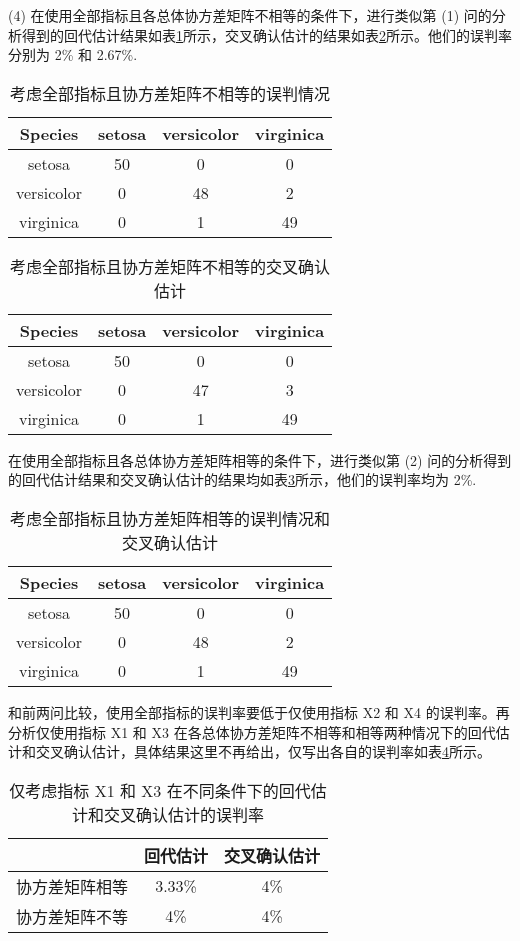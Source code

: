 \documentclass{ctexrep}
\begin{document}
(4) 在使用全部指标且各总体协方差矩阵不相等的条件下，进行类似第 (1) 问的分析得到的回代估计结果如表\ref{tab:ex555}所示，交叉确认估计的结果如表\ref{tab:ex556}所示。他们的误判率分别为 2\% 和 2.67\%.
\begin{table}[ht!]
\begin{center}
\begin{tabular}{c|ccc}
Species & setosa & versicolor & virginica \\
\hline
setosa & 50 & 0 & 0 \\
versicolor & 0 & 48 & 2 \\
virginica & 0 & 1 & 49
\end{tabular}
\end{center}
\caption{考虑全部指标且协方差矩阵不相等的误判情况}
\label{tab:ex555}
\end{table}
\begin{table}[h!]
\begin{center}
\begin{tabular}{c|ccc}
Species & setosa & versicolor & virginica \\
\hline
setosa & 50 & 0 & 0 \\
versicolor & 0 & 47 & 3 \\
virginica & 0 & 1 & 49
\end{tabular}
\end{center}
\caption{考虑全部指标且协方差矩阵不相等的交叉确认估计}
\label{tab:ex556}
\end{table}

在使用全部指标且各总体协方差矩阵相等的条件下，进行类似第 (2) 问的分析得到的回代估计结果和交叉确认估计的结果均如表\ref{tab:ex557}所示，他们的误判率均为 2\%.
\begin{table}[h!]
\begin{center}
\begin{tabular}{c|ccc}
Species & setosa & versicolor & virginica \\
\hline
setosa & 50 & 0 & 0 \\
versicolor & 0 & 48 & 2 \\
virginica & 0 & 1 & 49
\end{tabular}
\end{center}
\caption{考虑全部指标且协方差矩阵相等的误判情况和交叉确认估计}
\label{tab:ex557}
\end{table}

和前两问比较，使用全部指标的误判率要低于仅使用指标 X2 和 X4 的误判率。再分析仅使用指标 X1 和 X3 在各总体协方差矩阵不相等和相等两种情况下的回代估计和交叉确认估计，具体结果这里不再给出，仅写出各自的误判率如表\ref{tab:ex558}所示。
\begin{table}[ht!]
\begin{center}
\begin{tabular}{c|cc}
 & 回代估计 & 交叉确认估计 \\
\hline
协方差矩阵相等 & 3.33\% & 4\% \\
协方差矩阵不等 & 4\% & 4\% \\
\end{tabular}
\end{center}
\caption{仅考虑指标 X1 和 X3 在不同条件下的回代估计和交叉确认估计的误判率}
\label{tab:ex558}
\end{table}
\end{document}

